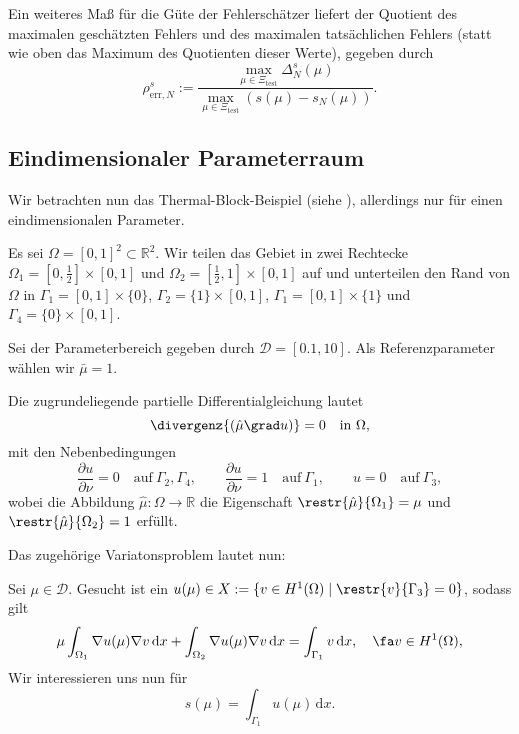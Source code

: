 Ein weiteres Maß für die Güte der Fehlerschätzer liefert der Quotient des maximalen geschätzten Fehlers und des maximalen tatsächlichen Fehlers (statt wie oben das Maximum des Quotienten dieser Werte), gegeben durch
\begin{equation}
     \rho^s_{\text{err},N} := \frac{\max\limits_{\mu \in \Xi_\text{test}} \Delta_N^s(\mu)}{\max\limits_{\mu \in \Xi_\text{test}} (s(\mu) - s_N(\mu))}.
\end{equation}


\subsection{Eindimensionaler Parameterraum} %
\label{sub:eindimensionaler_parameterraum}


Wir betrachten nun das Thermal-Block-Beispiel (siehe \cite[2.2.1]{Paro}), allerdings nur für einen eindimensionalen Parameter.

Es sei $\Omega = [ 0, 1 ]^2 \subset \mathbb{R}^2$. Wir teilen das Gebiet in zwei Rechtecke $\Omega_1 = [0, \frac{1}{2}] \times [ 0, 1 ] $ und $\Omega_2 = [ \frac{1}{2}, 1 ] \times [ 0, 1 ]$ auf und unterteilen den Rand von $\Omega$ in $\Gamma_1 = [0, 1] \times \{ 0 \}$, $\Gamma_2 = \{ 1 \} \times [0, 1]$, $\Gamma_1 = [0, 1] \times \{ 1 \}$ und $\Gamma_4 = \{ 0 \} \times [0, 1]$.

Sei der Parameterbereich gegeben durch $\mathcal D = [0.1, 10]$. Als Referenzparameter wählen wir $\bar \mu = 1$.

Die zugrundeliegende partielle Differentialgleichung lautet
\begin{equation}
    \divergenz{(\hat \mu \grad u)}  = 0 \quad \text{in}~\Omega,
\end{equation}
mit den Nebenbedingungen
\begin{equation}
        \frac{\partial u}{\partial \nu} = 0 \quad \text{auf}~\Gamma_2, \Gamma_4, \qquad
    \frac{\partial u}{\partial \nu} = 1 \quad \text{auf}~\Gamma_1, \qquad
    u                               = 0 \quad \text{auf}~\Gamma_3,
\end{equation}
wobei die Abbildung $\hat \mu \colon \Omega \to \mathbb{R}$ die Eigenschaft $\restr{\hat \mu}{\Omega_1} = \mu$ und $\restr{\hat \mu}{\Omega_2} = 1$ erfüllt.

Das zugehörige Variatonsproblem lautet nun:
\begin{addmargin}[2em]{2em}
Sei $\mu \in \mathcal D$. Gesucht ist ein $u(\mu) \in X := \{ v \in H^1(\Omega) \mid \restr{v}{\Gamma_3} = 0 \}$, sodass gilt
\begin{equation}
    \mu \int_{\Omega_1} \nabla u(\mu) \nabla v \, \mathrm d x + \int_{\Omega_2} \nabla u(\mu) \nabla v \, \mathrm d x = \int_{\Gamma_1} v \, \mathrm{d} x, \quad \fa v \in H^1(\Omega),
\end{equation}
Wir interessieren uns nun für
\begin{equation}
    s(\mu) = \int_{\Gamma_1} u(\mu) \, \mathrm{d}x.
\end{equation}
\end{addmargin}

